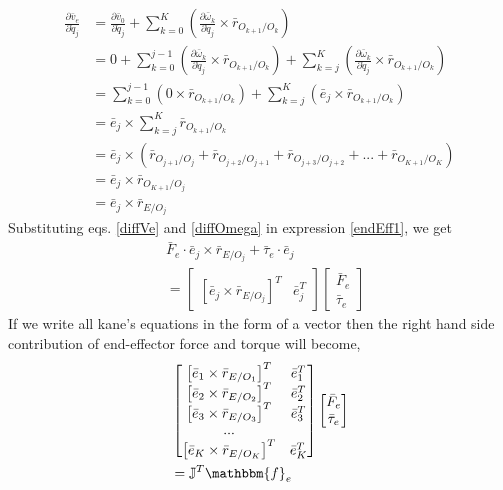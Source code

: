 \documentclass[a4paper,10pt]{article}
\begin{document}
\begin{align}
 \frac{\partial \bar{v}_e}{\partial \dot{q}_j} &= \frac{\partial \bar{v}_0}{\partial \dot{q}_j} + \sum\limits_{k=0}^K \left( \frac{\partial \bar\omega_k}{\partial \dot{q}_j} \times \bar{r}_{O_{k+1}/O_k} \right) \nonumber \\
 &= 0 + \sum\limits_{k=0}^{j-1} \left( \frac{\partial \bar\omega_k}{\partial \dot{q}_j} \times \bar{r}_{O_{k+1}/O_k} \right) 
       + \sum\limits_{k=j}^K \left( \frac{\partial \bar\omega_k}{\partial \dot{q}_j} \times \bar{r}_{O_{k+1}/O_k} \right) \nonumber \\
 &= \sum\limits_{k=0}^{j-1} \left( 0 \times \bar{r}_{O_{k+1}/O_k} \right) + \sum\limits_{k=j}^K \left( \bar{e}_j \times \bar{r}_{O_{k+1}/O_k} \right) \nonumber \\
 &= \bar{e}_j \times \sum\limits_{k=j}^K \bar{r}_{O_{k+1}/O_k} \nonumber \\
 &= \bar{e}_j \times \left( \bar{r}_{O_{j+1}/O_j} + \bar{r}_{O_{j+2}/O_{j+1}} + \bar{r}_{O_{j+3}/O_{j+2}} + ... + \bar{r}_{O_{K+1}/O_K}\right) \nonumber \\
 &= \bar{e}_j \times \bar{r}_{O_{K+1}/O_j} \nonumber \\
 &= \bar{e}_j \times \bar{r}_{E/O_j} \label{diffVe}
\end{align}
Substituting eqs. \ref{diffVe} and \ref{diffOmega} in expression \ref{endEff1}, we get
\begin{align}
 &\bar{F}_{e} \cdot \bar{e}_j \times \bar{r}_{E/O_j} + \bar\tau_{e} \cdot \bar{e}_j \nonumber \\
 &= \left[\begin{matrix} \left[\bar{e}_j \times \bar{r}_{E/O_j}\right]^T & \bar{e}_j^T \end{matrix} \right]\left[\begin{matrix} \bar{F}_e \\ \bar{\tau}_e \end{matrix} \right] \nonumber 
\end{align}
If we write all kane's equations in the form of a vector then the right hand side contribution of end-effector force and torque will become,
\begin{align}
 &\left[\begin{matrix}
 \left[\bar{e}_1 \times \bar{r}_{E/O_1}\right]^T & \bar{e}_1^T  \\
 \left[\bar{e}_2 \times \bar{r}_{E/O_2}\right]^T & \bar{e}_2^T  \\
 \left[\bar{e}_3 \times \bar{r}_{E/O_3}\right]^T & \bar{e}_3^T  \\
 ... & \\
 \left[\bar{e}_K \times \bar{r}_{E/O_K}\right]^T & \bar{e}_K^T  \\ 
 \end{matrix} \right]
 \left[\begin{matrix} \bar{F}_e \\ \bar{\tau}_e \end{matrix} \right] \nonumber \\ 
 &= \mathbb{J}^T\mathbbm{f}_e \label{endEff2}
\end{align}
\end{document}
